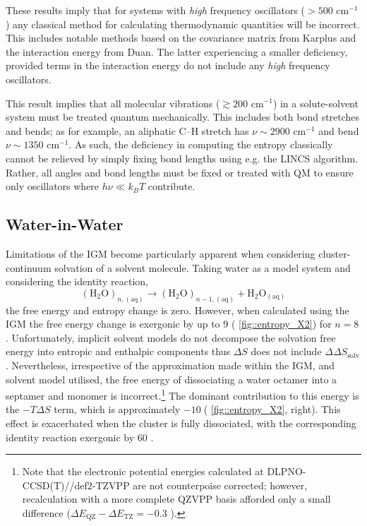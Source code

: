 \documentclass[../main.tex]{subfiles}
\begin{document}

These results imply that for systems with \emph{high} frequency oscillators ($> 500$ cm$^{-1}$) any classical method for calculating thermodynamic quantities will be incorrect. This includes notable methods based on the covariance matrix from Karplus\cite{Karplus1981} and the interaction energy from Duan\cite{Duan2016}. The latter experiencing a smaller deficiency, provided terms in the interaction energy do not include any \emph{high} frequency oscillators. 

This result implies that all molecular vibrations ($\gtrsim 200\text{ cm}^{-1}$) in a solute-solvent system must be treated quantum mechanically. This includes both bond stretches and bends; as for example, an aliphatic C--H stretch has $\nu \sim 2900$ cm$^{-1}$ and bend $\nu \sim 1350$ cm$^{-1}$.\cite{Coates2006} As such, the deficiency in computing the entropy classically cannot be relieved by simply fixing bond lengths using e.g. the LINCS algorithm.\cite{Hess1998} Rather, all angles and bond lengths must be fixed or treated with QM to ensure only oscillators where $h\nu \ll k_B T$ contribute. 


\subsection{Water-in-Water}

Limitations of the IGM become particularly apparent when considering cluster-continuum solvation of a solvent molecule. Taking water as a model system and considering the identity reaction,
\[(\text{H}_2\text{O})_{n, (\text{aq})} \rightarrow (\text{H}_2\text{O})_{n - 1, (\text{aq})} + \text{H}_2\text{O}_{(\text{aq})}
\]
the free energy and entropy change is zero. However, when calculated using the IGM the free energy change is exergonic by up to 9 \kcal (\figurename{ \ref{fig::entropy_X2}}) for $n=8$. Unfortunately, implicit solvent models do not decompose the solvation free energy into entropic and enthalpic components thus $\Delta S$ does not include $\Delta\Delta S_\text{solv}$. Nevertheless, irrespective of the approximation made within the IGM, and solvent model utilised, the free energy of dissociating a water octamer into a septamer and monomer is incorrect.\footnote{Note that the electronic potential energies calculated at DLPNO-CCSD(T)//def2-TZVPP are not counterpoise corrected; however, recalculation with a more complete QZVPP basis afforded only a small difference ($\Delta E_\text{QZ} - \Delta E_\text{TZ} = -0.3$ \kcal).} The dominant contribution to this energy is the $-T\Delta S$ term, which is approximately $ -10\;$\kcalx (\figurename{ \ref{fig::entropy_X2}, right}). This effect is exacerbated when the cluster is fully dissociated, with the corresponding identity reaction exergonic by 60 \kcal. 
\end{document}

